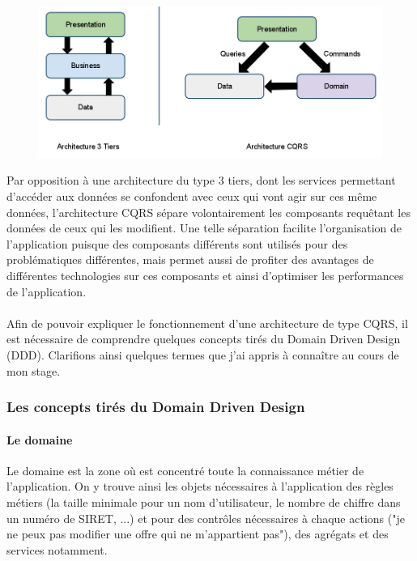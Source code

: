 \paragraph{}
\begin{figure}[h]
  \begin{center}
    \includegraphics[scale=0.4]{Figures/Chapter3/architecture/tiersvscqrs.png}
  \end{center}
\end{figure}
Par opposition à une architecture du type 3 tiers, dont les services permettant d'accéder aux données se confondent avec ceux qui vont agir sur ces même données, l'architecture CQRS sépare volontairement les composants requêtant les données de ceux qui les modifient.
Une telle séparation facilite l'organisation de l'application puisque des composants différents sont utilisés pour des problématiques différentes, mais permet aussi de profiter des avantages de différentes technologies sur ces composants et ainsi d'optimiser les performances de l'application.
\paragraph{}
Afin de pouvoir expliquer le fonctionnement d'une architecture de type CQRS, il est nécessaire de comprendre quelques concepts tirés du Domain Driven Design (DDD).
Clarifions ainsi quelques termes que j'ai appris à connaître au cours de mon stage.

\subsubsection{Les concepts tirés du Domain Driven Design}
\label{subs:Les concepts tirés du Domain Driven Design}
\paragraph{Le domaine}
\label{par:Le domaine}
Le domaine est la zone où est concentré toute la connaissance métier de l'application.
On y trouve ainsi les objets nécessaires à l'application des règles métiers (la taille minimale pour un nom d'utilisateur, le nombre de chiffre dans un numéro de SIRET, ...) et pour des contrôles nécessaires à chaque actions ("je ne peux pas modifier une offre qui ne m'appartient pas"), des agrégats et des services notamment.
